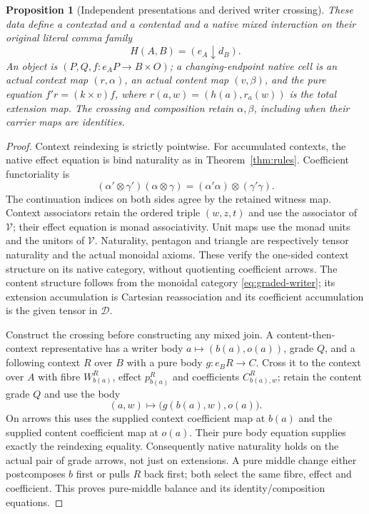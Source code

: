 \documentclass[11pt]{article}
\newtheorem{proposition}[theorem]{Proposition}
\begin{document}
\begin{proposition}[Independent presentations and derived writer crossing]\label{prop:graded-presentation}
These data define a contextad and a contentad and a native mixed interaction on their original literal comma family
\[
 H(A,B)=(e_A\downarrow d_B).
\]
An object is $(P,Q,f:e_AP\to B\times O)$; a changing-endpoint native cell is an actual context map $(r,\alpha)$, an actual content map $(v,\beta)$, and the pure equation $f'r=(k\times v)f$, where $r(a,w)=(h(a),r_a(w))$ is the total extension map. The crossing and composition retain $\alpha,\beta$, including when their carrier maps are identities.
\end{proposition}
\begin{proof}
Context reindexing is strictly pointwise. For accumulated contexts, the native effect equation is bind naturality as in Theorem~\ref{thm:rules}. Coefficient functoriality is
\[
 (\alpha'\otimes\gamma')(\alpha\otimes\gamma)
 =(\alpha'\alpha)\otimes(\gamma'\gamma).
\]
The continuation indices on both sides agree by the retained witness map. Context associators retain the ordered triple $(w,z,t)$ and use the associator of $\mathcal V$; their effect equation is monad associativity. Unit maps use the monad units and the unitors of $\mathcal V$. Naturality, pentagon and triangle are respectively tensor naturality and the actual monoidal axioms. These verify the one-sided context structure on its native category, without quotienting coefficient arrows. The content structure follows from the monoidal category \eqref{eq:graded-writer}; its extension accumulation is Cartesian reassociation and its coefficient accumulation is the given tensor in $\mathcal D$.

Construct the crossing before constructing any mixed join. A content-then-context representative has a writer body $a\mapsto(b(a),o(a))$, grade $Q$, and a following context $R$ over $B$ with a pure body $g:e_BR\to C$. Cross it to the context over $A$ with fibre $W^R_{b(a)}$, effect $p^R_{b(a)}$ and coefficients $C^R_{b(a),w}$; retain the content grade $Q$ and use the body
\[
 (a,w)\longmapsto\bigl(g(b(a),w),o(a)\bigr). \tag{GC}\label{eq:graded-crossing}
\]
On arrows this uses the supplied context coefficient map at $b(a)$ and the supplied content coefficient map at $o(a)$. Their pure body equation supplies exactly the reindexing equality. Consequently native naturality holds on the actual pair of grade arrows, not just on extensions. A pure middle change either postcomposes $b$ first or pulls $R$ back first; both select the same fibre, effect and coefficient. This proves pure-middle balance and its identity/composition equations.


\end{proof}
\end{document}
